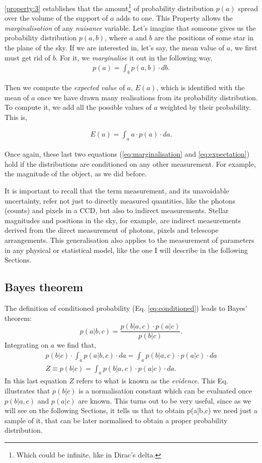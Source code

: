 \ref{property:3} establishes that the amount\footnote{Which could be infinite, like in Dirac's delta.} of probability distribution $p(a)$ spread over the volume of the support of $a$ adds to one. This Property allows the \emph{marginalisation} of any \emph{nuisance} variable. Let's imagine that someone gives us the probability distribution $p(a,b)$, where $a$ and $b$ are the positions of some star in the plane of the sky. If we are interested in, let's say, the mean value of $a$, we first must get rid of $b$. For it, we \emph{marginalise} it out in the following way,
\begin{align}
\label{eq:marginalisation}
p(a)=\int_b p(a,b)\cdot db.
\end{align}

Then we compute the \emph{expected value} of $a$, $E(a)$, which is identified with the mean of $a$ once we have drawn many realisations from its probability distribution. To compute it, we add all the possible values of $a$ weighted by their probability. This is,

\begin{align}
\label{eq:expectation}
E(a)=\int_a a\cdot p(a)\cdot da.
\end{align}

Once again, these last two equations (\ref{eq:marginalisation} and \ref{eq:expectation}) hold if the distributions are conditioned on any other measurement. For example, the magnitude of the object, as we did before. 

It is important to recall that the term measurement, and its unavoidable uncertainty, refer not just to directly measured quantities, like the photons (counts) and pixels in a CCD, but also to indirect measurements. Stellar magnitudes and positions in the sky, for example, are indirect measurements derived from the direct measurement of photons, pixels and telescope arrangements. This generalisation also applies to the measurement of parameters in any physical or statistical model, like the one I will describe in the following Sections.

\subsection{Bayes theorem}
The definition of conditioned probability (Eq. \ref{eq:conditioned}) leads to Bayes' theorem:
\begin{equation}
p(a|b,c) = \frac{p(b|a,c)\cdot p(a|c)}{p(b|c)}.
\end{equation}
Integrating on $a$ we find that,
\begin{align}
\label{eq:evidence}
p(b|c) \cdot \int_a p(a|b,c)\cdot da = \int_a p(b|a,c) \cdot p(a|c) \cdot da \nonumber \\
Z \equiv p(b|c) = \int_a p(b|a,c) \cdot p(a|c) \cdot da.
\end{align}
In this last equation $Z$ refers to what is known as the \emph{evidence}. This Eq. illustrates that $p(b|c)$ is a normalisation constant which can be evaluated once $p(b|a,c)$ and $p(a|c)$ are known. This turns out to be very useful, since as we will see on the following Sections, it tells us that to obtain p(a|b,c) we need just a sample of it, that can be later normalised to obtain a proper probability distribution.

